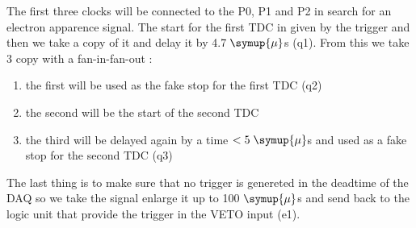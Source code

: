 The first three clocks will be connected to the P0, P1 and P2 in search for an electron
apparence signal. The start for the first TDC in given by the trigger and then we take a copy
of it and delay it by 4.7$\;\symup{\mu}$s (q1). From this we take 3 copy with a fan-in-fan-out :
\begin{enumerate}
\item the first will be used as the fake stop for the first TDC (q2)
\item the second will be the start of the second TDC
\item the third will be delayed again by a time $<5\;\symup{\mu}$s and used as a fake stop for the second TDC (q3)
\end{enumerate}
The last thing is to make sure that no trigger is genereted in the deadtime of the DAQ
so we take the signal enlarge it up to 100$\;\symup{\mu}$s and send back to the logic
unit that provide the trigger in the VETO input (e1).\\